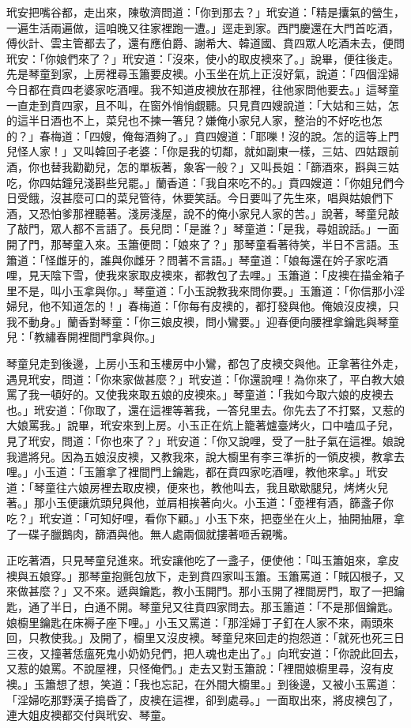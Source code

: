 玳安把嘴谷都，走出來，陳敬濟問道：「你到那去？」玳安道：「精是攮氣的營生，一遍生活兩遍做，這咱晚又往家裡跑一遭。」逕走到家。西門慶還在大門首吃酒，傅伙計、雲主管都去了，還有應伯爵、謝希大、韓道國、賁四眾人吃酒未去，便問玳安：「你娘們來了？」玳安道：「沒來，使小的取皮襖來了。」說畢，便往後走。先是琴童到家，上房裡尋玉簫要皮襖。小玉坐在炕上正沒好氣，說道：「四個淫婦今日都在賁四老婆家吃酒哩。我不知道皮襖放在那裡，往他家問他要去。」這琴童一直走到賁四家，且不叫，在窗外悄悄覷聽。只見賁四嫂說道：「大姑和三姑，怎的這半日酒也不上，菜兒也不揀一箸兒？嫌俺小家兒人家，整治的不好吃也怎的？」春梅道：「四嫂，俺每酒夠了。」賁四嫂道：「耶嚛！沒的說。怎的這等上門兒怪人家！」又叫韓回子老婆：「你是我的切鄰，就如副東一樣，三姑、四姑跟前酒，你也替我勸勸兒，怎的單板著，象客一般？」又叫長姐：「篩酒來，斟與三姑吃，你四姑鐘兒淺斟些兒罷。」蘭香道：「我自來吃不的。」賁四嫂道：「你姐兒們今日受餓，沒甚麼可口的菜兒管待，休要笑話。今日要叫了先生來，唱與姑娘們下酒，又恐怕爹那裡聽著。淺房淺屋，說不的俺小家兒人家的苦。」說著，琴童兒敲了敲門，眾人都不言語了。長兒問：「是誰？」琴童道：「是我，尋姐說話。」一面開了門，那琴童入來。玉簫便問：「娘來了？」那琴童看著待笑，半日不言語。玉簫道：「怪雌牙的，誰與你雌牙？問著不言語。」琴童道：「娘每還在妗子家吃酒哩，見天陰下雪，使我來家取皮襖來，都教包了去哩。」玉簫道：「皮襖在描金箱子里不是，叫小玉拿與你。」琴童道：「小玉說教我來問你要。」玉簫道：「你信那小淫婦兒，他不知道怎的！」春梅道：「你每有皮襖的，都打發與他。俺娘沒皮襖，只我不動身。」蘭香對琴童：「你三娘皮襖，問小鸞要。」迎春便向腰裡拿鑰匙與琴童兒：「教繡春開裡間門拿與你。」

琴童兒走到後邊，上房小玉和玉樓房中小鸞，都包了皮襖交與他。正拿著往外走，遇見玳安，問道：「你來家做甚麼？」玳安道：「你還說哩！為你來了，平白教大娘罵了我一頓好的。又使我來取五娘的皮襖來。」琴童道：「我如今取六娘的皮襖去也。」玳安道：「你取了，還在這裡等著我，一答兒里去。你先去了不打緊，又惹的大娘罵我。」說畢，玳安來到上房。小玉正在炕上籠著爐臺烤火，口中嗑瓜子兒，見了玳安，問道：「你也來了？」玳安道：「你又說哩，受了一肚子氣在這裡。娘說我遣將兒。因為五娘沒皮襖，又教我來，說大櫥里有李三準折的一領皮襖，教拿去哩。」小玉道：「玉簫拿了裡間門上鑰匙，都在賁四家吃酒哩，教他來拿。」玳安道：「琴童往六娘房裡去取皮襖，便來也，教他叫去，我且歇歇腿兒，烤烤火兒著。」那小玉便讓炕頭兒與他，並肩相挨著向火。小玉道：「壺裡有酒，篩盞子你吃？」玳安道：「可知好哩，看你下顧。」小玉下來，把壺坐在火上，抽開抽屜，拿了一碟子臘鵝肉，篩酒與他。無人處兩個就摟著咂舌親嘴。

正吃著酒，只見琴童兒進來。玳安讓他吃了一盞子，便使他：「叫玉簫姐來，拿皮襖與五娘穿。」那琴童抱氈包放下，走到賁四家叫玉簫。玉簫罵道：「賊囚根子，又來做甚麼？」又不來。遞與鑰匙，教小玉開門。那小玉開了裡間房門，取了一把鑰匙，通了半日，白通不開。琴童兒又往賁四家問去。那玉簫道：「不是那個鑰匙。娘櫥里鑰匙在床褥子座下哩。」小玉又罵道：「那淫婦丁子釘在人家不來，兩頭來回，只教使我。」及開了，櫥里又沒皮襖。琴童兒來回走的抱怨道：「就死也死三日三夜，又撞著恁瘟死鬼小奶奶兒們，把人魂也走出了。」向玳安道：「你說此回去，又惹的娘罵。不說屋裡，只怪俺們。」走去又對玉簫說：「裡間娘櫥里尋，沒有皮襖。」玉簫想了想，笑道：「我也忘記，在外間大櫥里。」到後邊，又被小玉罵道：「淫婦吃那野漢子搗昏了，皮襖在這裡，卻到處尋。」一面取出來，將皮襖包了，連大姐皮襖都交付與玳安、琴童。

